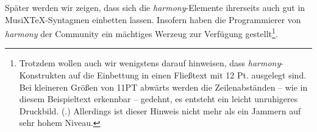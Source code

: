 Später werden wir zeigen, dass sich die \textit{harmony}-Elemente ihrerseits auch
gut in MusiX\TeX-Syntagmen einbetten lassen. Insofern haben die Programmierer
von \textit{harmony} der Community ein mächtiges Werzeug zur Verfügung
gestellt\footnote{Trotzdem wollen auch wir wenigstens darauf hinweisen, dass
\textit{harmony}-Konstrukten auf die Einbettung in einen Fließtext mit 12 Pt.
ausgelegt sind. Bei kleineren Größen von 11PT abwärts werden die Zeilenabständen
-- wie in diesem Beispieltext erkennbar -- gedehnt, es entsteht ein leicht
unruhigeres Druckbild. (\cite[Vgl. dazu][2]{WegWeg2007a}.) Allerdings ist dieser
Hinweis nicht mehr als ein Jammern auf sehr hohem Niveau.}.


%
